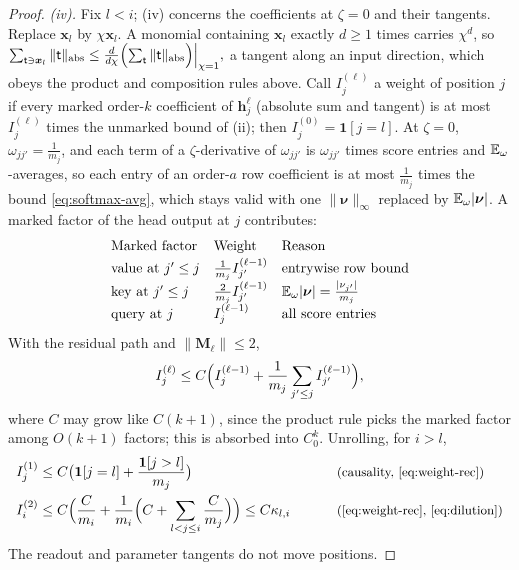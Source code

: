 \begin{proof}
\emph{(iv).} Fix $l<i$; (iv) concerns the coefficients at $\zeta=0$ and their tangents. Replace $\bm x_l$ by $\chi\bm x_l$. A monomial containing $\bm x_l$
exactly $d\ge1$ times carries $\chi^d$, so
 $\sum_{\mathsf t\ni\bm x_l}\|\mathsf t\|_{\mathrm{abs}}\le\frac{d}{d\chi}\Bigl(\sum_{\mathsf t}\|\mathsf t\|_{\mathrm{abs}}\Bigr)\Big|_{\chi=1},$ 
a tangent along an input direction, which obeys the product and composition rules above. Call $I^{(\ell)}_j$ a weight of position $j$ if every
marked order-$k$ coefficient of $\bm h^\ell_j$ (absolute sum and tangent) is at most $I^{(\ell)}_j$ times the unmarked bound of (ii); then
$I^{(0)}_j=\mathbf 1[j=l]$. At $\zeta=0$, $\omega_{jj'}=\frac{1}{m_j}$, and each term of a $\zeta$-derivative of $\omega_{jj'}$ is $\omega_{jj'}$ times score entries and
$\mathbb E_\omega$-averages, so each entry of an order-$a$ row coefficient is at most $\frac{1}{m_j}$ times the bound \cref{eq:softmax-avg}, which stays
valid with one $\|\bm\nu\|_\infty$ replaced by $\mathbb E_\omega|\bm\nu|$. A marked factor of the head output at $j$ contributes:
\[
\begin{array}{@{}lll@{}}
 \text{Marked factor} & \text{Weight} & \text{Reason}\\[2pt]
 \text{value at }j'\le j & \frac{1}{m_j}I^{(\ell-1)}_{j'} & \text{entrywise row bound}\\[2pt]
 \text{key at }j'\le j & \frac{2}{m_j}I^{(\ell-1)}_{j'} & \E_\omega|\bm\nu|=\frac{|\nu_{j'}|}{m_j}\\[2pt]
 \text{query at }j & I^{(\ell-1)}_j & \text{all score entries}
\end{array}
\]
With the residual path and $\|\mathbf M_\ell\|\le2$,
\begin{equation}
 I^{(\ell)}_j\le C\Bigl(I^{(\ell-1)}_j+\frac{1}{m_j}\sum_{j'\le j}I^{(\ell-1)}_{j'}\Bigr),
 \label{eq:weight-rec}
\end{equation}
where $C$ may grow like $C(k+1)$, since the product rule picks the marked factor among $O(k+1)$ factors; this is absorbed into $C_0^k$.
Unrolling, for $i>l$,
\begin{alignat*}{2}
 I^{(1)}_j&\le C\bigl(\mathbf 1[j=l]+\frac{\mathbf 1[j>l]}{m_j}\bigr) &\qquad& \why{causality, \cref{eq:weight-rec}}\\
 I^{(2)}_i&\le C\Bigl(\frac{C}{m_i}+\frac{1}{m_i}\Bigl(C+\sum_{l<j\le i}\frac{C}{m_j}\Bigr)\Bigr)\le C\kappa_{l,i} && \why{\cref{eq:weight-rec}, \cref{eq:dilution}}
\end{alignat*}
The readout and parameter tangents do not move positions.
\end{proof}

